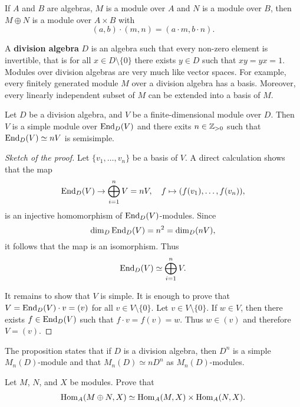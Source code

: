 \section{}


\begin{exercise}
If $A$ and $B$ are algebras, $M$ is a module over $A$ and $N$ is a module over $B$, then 
    $M\oplus N$ is a module over $A\times B$ with 
    \[
    (a,b)\cdot (m,n)=(a\cdot m,b\cdot n).
    \]
\end{exercise}


A \textbf{division algebra} $D$ is an algebra such that every non-zero element 
is invertible, that is for all $x\in D\setminus\{0\}$ there exists $y\in D$ such that $xy=yx=1$.  
Modules over division algebras are very much like vector spaces.  For example, 
every finitely generated module $M$ over a division algebra has a basis. 
Moreover, every linearly independent subset of
$M$ can be extended into a basis of $M$. 

\begin{proposition}
	Let $D$ be a division algebra, and $V$ be a finite-dimensional module over $D$. Then 
	$V$ is a simple module over $\operatorname{End}_D(V)$ and there exits $n\in\mathbb{Z}_{>0}$ such that  
	$\operatorname{End}_D(V)\simeq nV$ is semisimple.
\end{proposition}

\begin{proof}[Sketch of the proof]
	Let $\{v_1,\dots,v_n\}$ be a basis of $V$. A direct calculation shows that the map 
	\[
		\operatorname{End}_D(V)\to\bigoplus_{i=1}^nV=nV,\quad
		f\mapsto (f(v_1),\dots,f(v_n)),
	\]
	is an injective homomorphism of $\operatorname{End}_D(V)$-modules.
	Since
	\[
	\dim_D\operatorname{End}_D(V)=n^2=\dim_D(nV),
	\]
	it follows that the map is an isomorphism. 
	Thus 
	\[
		\operatorname{End}_D(V)\simeq \bigoplus_{i=1}^nV.
	\]
	
	It remains to show that $V$ is simple. It is enough to prove that $V=\operatorname{End}_D(V)\cdot v=(v)$ 
	for all $v\in V\setminus\{0\}$. Let $v\in V\setminus\{0\}$. If $w\in V$, then 
	there exists $f\in\operatorname{End}_D(V)$ such that $f\cdot v=f(v)=w$. 
	Thus $w\in (v)$ and therefore $V=(v)$.  
\end{proof}

The proposition states that if $D$ is a division algebra, then  
$D^{n}$ is a simple $M_n(D)$-module and that $M_n(D)\simeq n D^n$ as $M_n(D)$-modules. 

\begin{exercise}
    Let $M$, $N$, and $X$ be modules. Prove that 
    \begin{align}
        \operatorname{Hom}_A(M\oplus N,X)\simeq\operatorname{Hom}_A(M,X)\times\operatorname{Hom}_A(N,X).
    \end{align}
\end{exercise}


